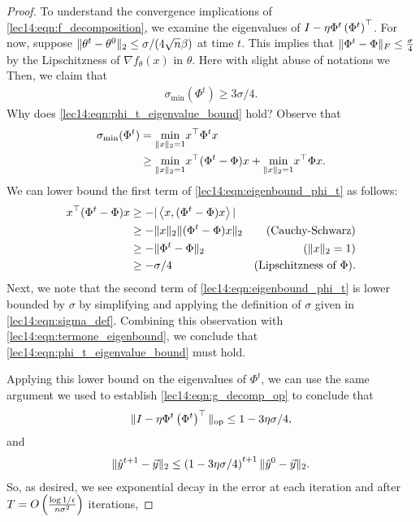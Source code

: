 \begin{proof}
To understand the convergence implications of \eqref{lec14:eqn:f_decomposition}, we examine the eigenvalues of \linebreak $I - \eta \Phi^t \left(\Phi^t\right)^\top$. For now, suppose $\|\theta^t - \theta^0\|_2 \leq \sigma/(4\sqrt{n}\beta)$ at time $t$. This implies that $\|\Phi^t - \Phi\|_F \leq \frac{\sigma}{4}$ by the Lipschitzness of $\nabla f_\theta(x)$ in $\theta$. Here with slight abuse of notations we 
Then, we claim that 
\begin{align}
    \sigma_{\text{min}}(\Phi^t) \geq 3\sigma/4. \label{lec14:eqn:phi_t_eigenvalue_bound}
\end{align}
Why does \eqref{lec14:eqn:phi_t_eigenvalue_bound} hold? Observe that
\begin{align}
    \sigma_\text{min}(\Phi^t) &= \underset{\|x\|_2=1}{\text{min}} x^\top \Phi^tx \\
   &\geq \underset{\|x\|_2=1}{\text{min}} x^\top (\Phi^t - \Phi)x + \underset{\|x\|_2=1}{\text{min}}  x^\top \Phi x. \label{lec14:eqn:eigenbound_phi_t}
\end{align}
We can lower bound the first term of \eqref{lec14:eqn:eigenbound_phi_t} as follows:
\begin{align}
    x^\top (\Phi^t - \Phi)x &\geq -|\left<x, (\Phi^t - \Phi)x\right>| \\
    &\geq -\|x\|_2 \|(\Phi^t - \Phi)x\|_2 &\text{(Cauchy-Schwarz)}\\ 
    &\geq -\|\Phi^t - \Phi\|_2 &\text{($\|x\|_2 = 1$)}\\ 
    &\geq -\sigma/4 &\text{(Lipschitzness of $\Phi$)}. \label{lec14:eqn:termone_eigenbound}
\end{align}
Next, we note that the second term of \eqref{lec14:eqn:eigenbound_phi_t} is lower bounded by $\sigma$ by simplifying and applying the definition of $\sigma$ given in \eqref{lec14:eqn:sigma_def}. Combining this observation with \eqref{lec14:eqn:termone_eigenbound}, we conclude that \eqref{lec14:eqn:phi_t_eigenvalue_bound} must hold.

Applying this lower bound on the eigenvalues of $\Phi^t$, we can use the same argument we used to establish \eqref{lec14:eqn:g_decomp_op} to conclude that
\begin{align}
    \|I - \eta \Phi^t \left(\Phi^t\right)^\top\|_{\text{op}} \leq 1 - 3\eta \sigma/4 \label{lec14:eqn:op_norm_bound},
\end{align}
and 
\begin{align}
    \|\hat{y}^{t+1} - \vec{y}\|_{2} \leq \left(1 - 3\eta \sigma/4\right)^{t+1} \|\hat{y}^{0} - \vec{y}\|_{2}.
\end{align}
So, as desired, we see exponential decay in the error at each iteration and after $T = O \left( \frac{\log 1/\epsilon}{n\sigma^2}\right)$ iterations,


\end{proof}
